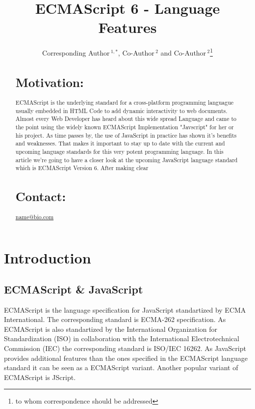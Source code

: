 \documentclass{bioinfo}
\begin{document}

\title[short Title]{ECMAScript 6 - Language Features}
\author[Sample \textit{et~al}]{Corresponding Author\,$^{1,*}$, Co-Author\,$^{2}$ and Co-Author\,$^2$\footnote{to whom correspondence should be addressed}}
\address{$^{1}$Department of XXXXXXX, Address XXXX etc.\\
$^{2}$Department of XXXXXXXX, Address XXXX etc.}



\maketitle

\begin{abstract}

\section{Motivation:}
ECMAScript is the underlying standard for a cross-platform programming languague usually embedded in HTML Code to add dynamic interactivity to web documents. 
Almost every Web Developer has heard about this wide spread Language and came to the point using the widely known ECMAScript Implementation "Javscript" for her or his project. 
As time passes by, the use of JavaScript in practice has shown it's benefits and weaknesses.
That makes it important to stay up to date with the current and upcoming language standards for this very potent programming language.  
In this article we're going to have a closer look at the upcoming JavaScript language standard which is ECMAScript Version 6.
After making clear 

\section{Contact:} \href{name@bio.com}{name@bio.com}
\end{abstract}
\section{Introduction}
\subsection{ECMAScript \& JavaScript}
ECMAScript is the language specification for JavaScript standartized by ECMA International. The corresponding standard is ECMA-262 specification. As ECMAScript is also standartized
by the International Organization for Standardization (ISO) in collaboration with the International Electrotechnical Commission (IEC) the corresponding standard is ISO/IEC 16262.
As JavaScript provides additional features than the ones specified in the ECMAScript language standard it can be seen as a ECMAScript variant. Another popular variant of ECMAScript is JScript.
\end{document}
